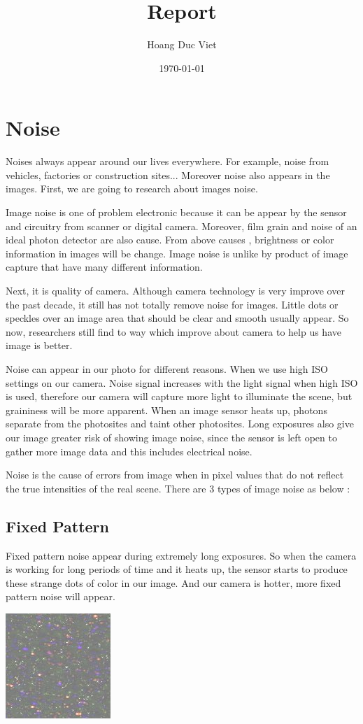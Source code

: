 \documentclass[10pt]{article}
\begin{document}
		\title{Report}
		\author{Hoang Duc Viet}
		\date{\today}
		\maketitle

\newpage
\newpage
\section{Noise}
Noises always appear around our lives everywhere. For example, noise from vehicles, factories or construction sites... Moreover noise also appears in the images. First, we are going to research about images noise.

Image noise is one of problem electronic because it can be appear by the sensor and circuitry from scanner or digital camera. Moreover, film grain and noise of an ideal photon detector are also cause. From above causes , brightness or color information in images will be change. Image noise is unlike by product of image capture that have many different information.

Next, it is quality of camera. Although camera technology is very improve over the past decade, it still has not totally remove noise for images. Little dots or speckles over an image area that should be clear and smooth usually appear. So now, researchers still find to way which improve about camera to help us have image is better.   


Noise can appear in our photo for different reasons. When we use high ISO settings on our camera. Noise signal increases with the light signal when high ISO is used, therefore our camera will capture more light to illuminate the scene, but graininess will be more apparent.  When an image sensor heats up, photons separate from the photosites and taint other photosites. Long exposures also give our image greater risk of showing image noise, since the sensor is left open to gather more image data and this includes electrical noise.

Noise is the cause of errors from image when in pixel values that do not reflect the true intensities of the real scene. There are 3 types of image noise as below :

\subsection{Fixed Pattern}
Fixed pattern noise appear during extremely long exposures. So when the camera is working for long periods of time and it heats up, the sensor starts to produce these strange dots of color in our image. And our camera is hotter, more fixed pattern noise will appear.
\begin{center}
	\includegraphics{fix.png}
\end{center}
\end{document}
